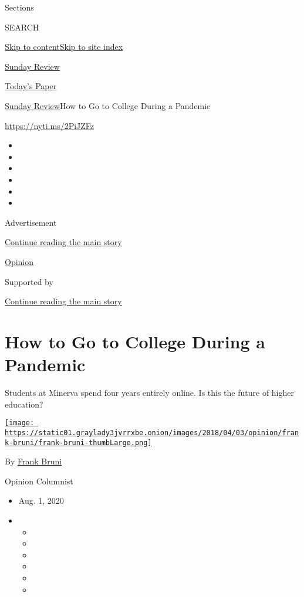 Sections

SEARCH

\protect\hyperlink{site-content}{Skip to
content}\protect\hyperlink{site-index}{Skip to site index}

\href{https://www.nytimes3xbfgragh.onion/section/opinion/sunday}{Sunday
Review}

\href{https://myaccount.nytimes3xbfgragh.onion/auth/login?response_type=cookie\&client_id=vi}{}

\href{https://www.nytimes3xbfgragh.onion/section/todayspaper}{Today's
Paper}

\href{/section/opinion/sunday}{Sunday Review}\textbar{}How to Go to
College During a Pandemic

\url{https://nyti.ms/2PiJZFz}

\begin{itemize}
\item
\item
\item
\item
\item
\item
\end{itemize}

Advertisement

\protect\hyperlink{after-top}{Continue reading the main story}

\href{/section/opinion}{Opinion}

Supported by

\protect\hyperlink{after-sponsor}{Continue reading the main story}

\hypertarget{how-to-go-to-college-during-a-pandemic}{%
\section{How to Go to College During a
Pandemic}\label{how-to-go-to-college-during-a-pandemic}}

Students at Minerva spend four years entirely online. Is this the future
of higher education?

\href{https://www.nytimes3xbfgragh.onion/by/frank-bruni}{\texttt{[image: https://static01.graylady3jvrrxbe.onion/images/2018/04/03/opinion/frank-bruni/frank-bruni-thumbLarge.png]}}

By \href{https://www.nytimes3xbfgragh.onion/by/frank-bruni}{Frank Bruni}

Opinion Columnist

\begin{itemize}
\item
  Aug. 1, 2020
\item
  \begin{itemize}
  \item
  \item
  \item
  \item
  \item
  \item
  \end{itemize}
\end{itemize}

